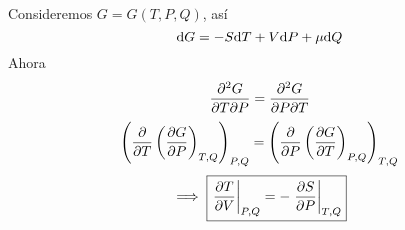 \begin{ej}
	Consideremos $G=G(T,P,Q)$, así
	\begin{equation}
  \dd G=-S\dd T+V\dd P+\mu \dd Q
\end{equation}
Ahora
\begin{equation}
  \pdv{G}{T}{P}=\pdv{G}{P}{T}
\end{equation}
\begin{equation}
  \left(\pdv{T}\left(\pdv{G}{P}\right)_{T,Q}\right)_{P,Q}=\left(\pdv{P}\left(\pdv{G}{T}\right)_{P,Q}\right)_{T,Q}
\end{equation}
\begin{equation}
  \implies \boxed{\eval{\pdv{T}{V}}_{P,Q}=-\eval{\pdv{S}{P}}_{T,Q}}
\end{equation}
\end{ej}

